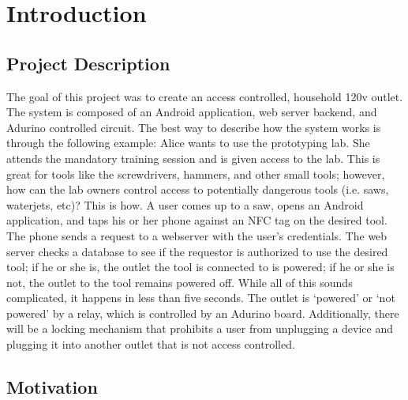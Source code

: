\documentclass{sigchi}
\begin{document}




\section{Introduction}

\subsection {Project Description}
The goal of this project was to create an access controlled, household 120v outlet. The system is composed of an Android application, web server backend, and Adurino controlled circuit. The best way to describe how the system works is through the following example: Alice wants to use the prototyping lab. She attends the mandatory training session and is given access to the lab. This is great for tools like the screwdrivers, hammers, and other small tools; however, how can the lab owners control access to potentially dangerous tools (i.e. saws, waterjets, etc)? This is how. A user comes up to a saw, opens an Android application, and taps his or her phone against an NFC tag on the desired tool. The phone sends a request to a webserver with the user’s credentials. The web server checks a database to see if the requestor is authorized to use the desired tool; if he or she is, the outlet the tool is connected to is powered; if he or she is not, the outlet to the tool remains powered off. While all of this sounds complicated, it happens in less than five seconds. The outlet is ‘powered’ or ‘not powered’ by a relay, which is controlled by an Adurino board. Additionally, there will be a locking mechanism that prohibits a user from unplugging a device and plugging it into another outlet that is not access controlled.

\subsection {Motivation}
\end{document}
